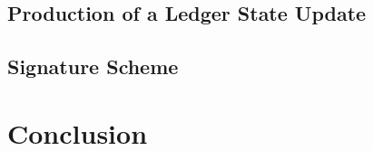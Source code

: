 \documentclass[a4paper, 12pt]{article}
\begin{document}


\subsection{Production of a Ledger State Update}\label{Sec:SecLsu}




\subsection{Signature Scheme}\label{Sec:SSS}




 \newpage
 
\section*{Conclusion} \label{Cha:Con}



 \newpage
\printbibliography
\nocite{*}
\end{document}
